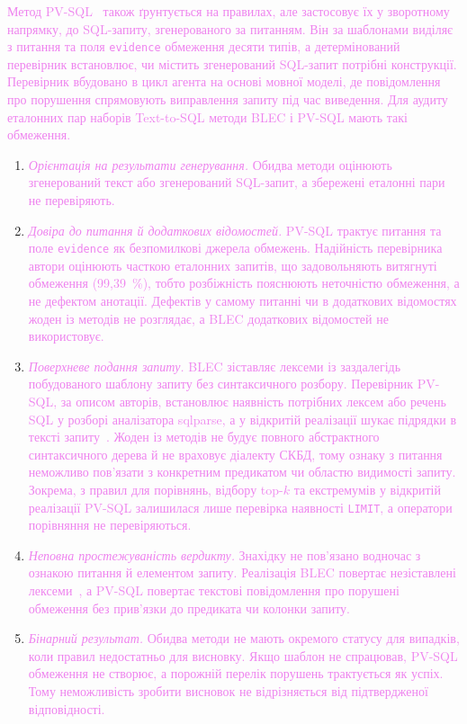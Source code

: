 \documentclass[a4paper,14pt,oneside]{extreport}
\begin{document}
\textcolor{violet}{Метод PV-SQL~\cite{tian2026pvsql} також ґрунтується на правилах, але застосовує їх у зворотному напрямку, до SQL-запиту, згенерованого за питанням. Він за шаблонами виділяє з питання та поля \texttt{evidence} обмеження десяти типів, а детермінований перевірник встановлює, чи містить згенерований SQL-запит потрібні конструкції. Перевірник вбудовано в цикл агента на основі мовної моделі, де повідомлення про порушення спрямовують виправлення запиту під час виведення. Для аудиту еталонних пар наборів Text-to-SQL методи BLEC і PV-SQL мають такі обмеження.}
\begin{enumerate}\setlength{\itemsep}{0pt}\setlength{\parsep}{0pt}\setlength{\parskip}{0pt}
\item \textcolor{violet}{\textit{Орієнтація на результати генерування.} Обидва методи оцінюють згенерований текст або згенерований SQL-запит, а збережені еталонні пари не перевіряють.}
\item \textcolor{violet}{\textit{Довіра до питання й додаткових відомостей.} PV-SQL трактує питання та поле \texttt{evidence} як безпомилкові джерела обмежень. Надійність перевірника автори оцінюють часткою еталонних запитів, що задовольняють витягнуті обмеження (99,39~\%), тобто розбіжність пояснюють неточністю обмеження, а не дефектом анотації. Дефектів у самому питанні чи в додаткових відомостях жоден із методів не розглядає, а BLEC додаткових відомостей не використовує.}
\item \textcolor{violet}{\textit{Поверхневе подання запиту.} BLEC зіставляє лексеми із заздалегідь побудованого шаблону запиту без синтаксичного розбору. Перевірник PV-SQL, за описом авторів, встановлює наявність потрібних лексем або речень SQL у розборі аналізатора sqlparse, а у відкритій реалізації шукає підрядки в тексті запиту~\cite{pvsqlRepo}. Жоден із методів не будує повного абстрактного синтаксичного дерева й не враховує діалекту СКБД, тому ознаку з питання неможливо пов'язати з конкретним предикатом чи областю видимості запиту. Зокрема, з правил для порівнянь, відбору top-$k$ та екстремумів у відкритій реалізації PV-SQL залишилася лише перевірка наявності \texttt{LIMIT}, а оператори порівняння не перевіряються.}
\item \textcolor{violet}{\textit{Неповна простежуваність вердикту.} Знахідку не пов'язано водночас з ознакою питання й елементом запиту. Реалізація BLEC повертає незіставлені лексеми~\cite{blecRepo}, а PV-SQL повертає текстові повідомлення про порушені обмеження без прив'язки до предиката чи колонки запиту.}
\item \textcolor{violet}{\textit{Бінарний результат.} Обидва методи не мають окремого статусу для випадків, коли правил недостатньо для висновку. Якщо шаблон не спрацював, PV-SQL обмеження не створює, а порожній перелік порушень трактується як успіх. Тому неможливість зробити висновок не відрізняється від підтвердженої відповідності.}
\end{enumerate}
\end{document}
